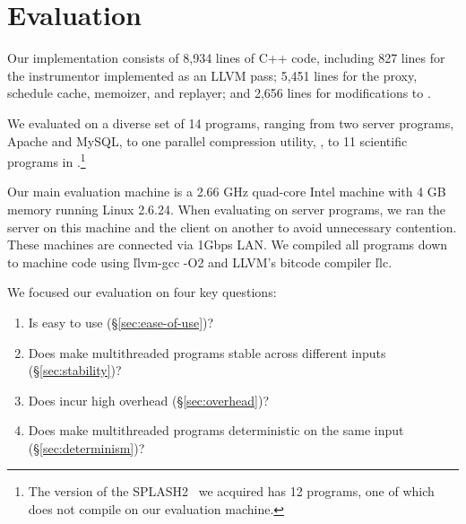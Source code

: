 \section{Evaluation}
\label{sec:tern-evaluation}

Our \tern implementation consists of 8,934 lines of C++ code, including 827
lines for the instrumentor implemented as an LLVM pass; 5,451 lines for
the proxy, schedule cache, memoizer, and replayer; and 2,656 lines for
modifications to \klee.

We evaluated \tern on a diverse set of 14 programs, ranging from two server
programs, Apache and MySQL, to one parallel compression utility, \pbzip, to
11 scientific programs in \splash.\footnote{The version of the
  SPLASH2~\cite{lu:bugbench} we acquired has 12 programs, one of which does
  not compile on our evaluation machine.}

Our main evaluation machine is a 2.66 GHz quad-core Intel machine with 4
GB memory running Linux 2.6.24.  When evaluating \tern on server programs, we
ran the server on this machine and the client on another to avoid
unnecessary contention.  These machines are connected via 1Gbps LAN.  We
compiled all programs down to machine code using \v{llvm-gcc -O2} and
LLVM's bitcode compiler \v{llc}.

We focused our evaluation on four key questions:
\begin{enumerate}

\item Is \tern easy to use (\S\ref{sec:ease-of-use})?

\item Does \tern make multithreaded programs stable across different inputs
  (\S\ref{sec:stability})?

\item Does \tern incur high overhead (\S\ref{sec:overhead})?

\item Does \tern make multithreaded programs deterministic on the same
  input (\S\ref{sec:determinism})?

\end{enumerate}





